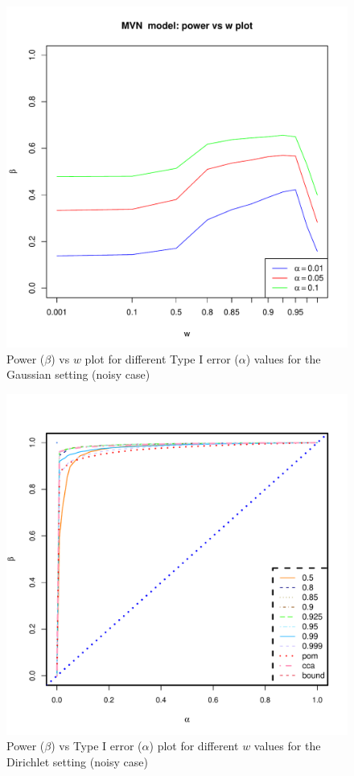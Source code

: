\documentclass[11pt]{article} %
\begin{document}
\begin{figure}
\includegraphics[scale=0.95]{OOS-MVN-power-w-c0-01.pdf}
\caption{Power ($\beta$) vs $w$ plot for different Type I error ($\alpha$) values for the Gaussian setting (noisy case)}
\label{fig:MVN-c001-power-w}
\end{figure}


\begin{figure}
\includegraphics[scale=0.35]{Dirichlet-FC-Tradeoff-OOSc0-01-n150.pdf}
\caption{Power ($\beta$) vs Type I error ($\alpha$) plot for different $w$ values for the Dirichlet setting (noisy case)}
\label{fig:Dir-c001-power-alpha}
\end{figure}
\end{document}
